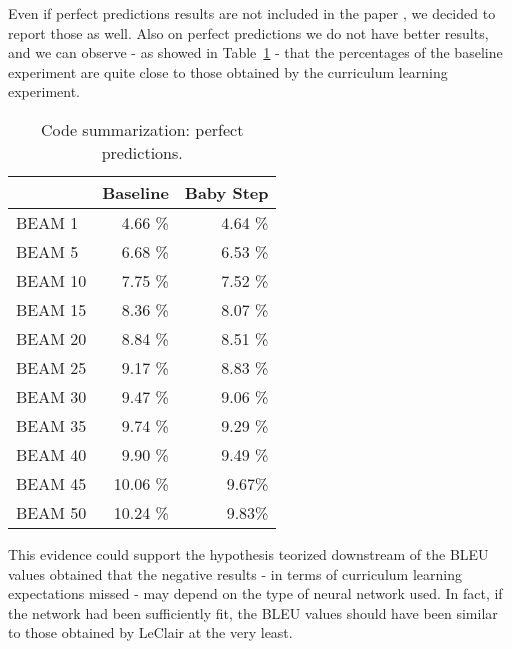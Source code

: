 Even if perfect predictions results are not included in the paper \cite{Leclair2020}, we decided to report
those as well. Also on perfect predictions we do not have better results, and we can observe - as showed in Table~\ref{table:2} - that the
percentages of the baseline experiment are quite close to those obtained by the curriculum learning experiment.
\begin{table}[h!]
    \centering
    \begin{tabular}{l|r|r} 
    & Baseline & Baby Step\\ [0.5ex] 
    \hline
    BEAM 1 & 4.66 \% & 4.64 \%\\  
    BEAM 5 & 6.68 \% & 6.53 \% \\ 
    BEAM 10 & 7.75 \% & 7.52 \%\\
    BEAM 15 & 8.36 \% & 8.07 \%\\
    BEAM 20 & 8.84 \% & 8.51 \%\\
    BEAM 25 & 9.17 \% & 8.83 \%\\
    BEAM 30 & 9.47 \% & 9.06 \%\\
    BEAM 35 & 9.74 \% & 9.29 \%\\
    BEAM 40 & 9.90 \% & 9.49 \%\\
    BEAM 45 & 10.06 \%& 9.67\%\\
    BEAM 50 & 10.24 \%& 9.83\%\\ [1ex]
    \end{tabular}
    \caption{Code summarization: perfect predictions.}
    \label{table:2}
\end{table}
This evidence could support the hypothesis teorized downstream of the BLEU values obtained 
that the negative results - in terms of curriculum learning 
expectations missed - may depend on the type of neural network used. 
In fact, if the network had been sufficiently 
fit, the BLEU values should have been similar to those obtained by LeClair \cite{Leclair2020} at the very least.

